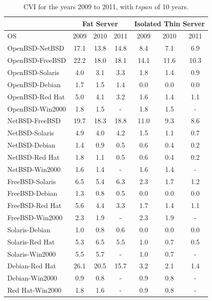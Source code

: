 \begin{table}[!ht]
\begin{center}
{\scriptsize
\begin{tabular}{|l|c c c|| c c c |}
\cline{2-7}
\multicolumn{1}{c}{} &  \multicolumn{3}{|c||}{\textbf{Fat Server}}  &  \multicolumn{3}{|c|}{\textbf{Isolated Thin Server}} \\ \hline
OS             & 2009 &	2010 & 	2011        & 	2009 & 	2010 & 2011 \\ \hline
OpenBSD-NetBSD  & 17.1 & 13.8 & 14.8        & 8.4 & 7.1 & 6.9   \\
OpenBSD-FreeBSD & 22.2 & 18.0 & 18.1        & 14.1  & 11.6 & 10.3  \\
OpenBSD-Solaris & 4.0 & 3.1 & 3.3           &  1.8 & 1.4 & 0.9  \\
OpenBSD-Debian  & 1.7 & 1.5 & 1.4           &  0.0 & 0.0 & 0.0  \\
OpenBSD-Red Hat & 5.0 & 4.1 & 3.2           &  1.6 & 1.4 & 1.1  \\
OpenBSD-Win2000 & 1.8 & 1.5 & -             &  1.8 & 1.5 & -  \\  \hline
NetBSD-FreeBSD  & 19.7 & 18.3 & 18.8        & 11.0 & 9.3 & 8.6 \\
NetBSD-Solaris  & 4.9 & 4.0 & 4.2           &  1.5 & 1.1 & 0.7  \\
NetBSD-Debian   & 1.4 & 0.9 & 0.5           &  0.6 & 0.4 & 0.2  \\
NetBSD-Red Hat  & 1.8 & 1.1 & 0.5           &  0.6 & 0.4 & 0.2  \\
NetBSD-Win2000  & 1.6 & 1.4 & -             & 1.6 & 1.4 & -   \\ \hline
FreeBSD-Solaris & 6.5 & 5.4 & 6.3           & 2.3 & 1.7 & 1.2  \\
FreeBSD-Debian  & 1.3 & 0.8 & 0.5           & 0.0 & 0.0 & 0.0  \\
FreeBSD-Red Hat & 5.6 & 4.4 & 3.3           & 1.7 & 1.4 & 1.1  \\
FreeBSD-Win2000 & 2.3 & 1.9 & -             & 2.3 & 1.9 & -  \\ \hline
Solaris-Debian  & 1.0 & 0.8 & 0.6           & 0.0 & 0.0 & 0.0  \\
Solaris-Red Hat & 5.3 & 6.5 & 5.5           & 1.0 & 0.7 & 0.5  \\
Solaris-Win2000 & 5.5 & 5.7 & -             & 1.0 & 0.7 & -  \\ \hline
Debian-Red Hat  & 26.1 & 20.5 & 15.7        & 3.2 & 2.1 & 1.4  \\
Debian-Win2000  & 0.9 & 0.8 & -             & 0.9 & 0.8 & -   \\ \hline
Red Hat-Win2000 & 1.8 & 1.6 & -             & 0.9 & 0.8 & -   \\ \hline
\end{tabular}
\caption{CVI for the years 2009 to 2011, with $\mathit{tspan}$ of 10 years.}
\label{tab:cvi-2011-2009}
}
\end{center}
\end{table}

